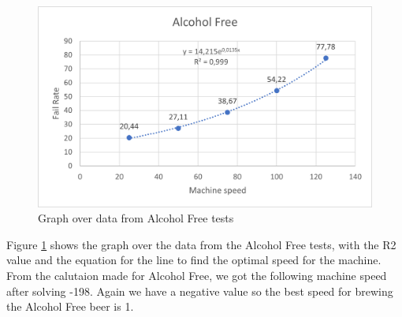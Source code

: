\begin{center}
    \centering
    \begin{figure}[H]
        \includegraphics[width=1\textwidth]{img/AlcoholFree_graph.png}
        \caption{Graph over data from Alcohol Free tests}
        \label{fig:AlcoholFree_graph}
    \end{figure}
\end{center}

Figure \ref{fig:AlcoholFree_graph} shows the graph over the data from the Alcohol Free tests, with the R2 value and the equation for the line to find the optimal speed for the machine. \newline
From the calutaion made for Alcohol Free, we got the following machine speed after solving -198. Again we have a negative value so the best speed for brewing the Alcohol Free beer is 1. \newline